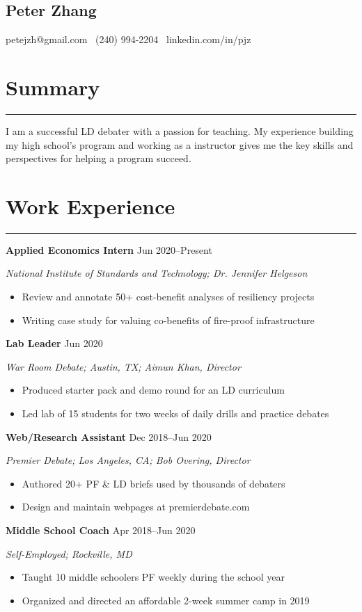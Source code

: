 \documentclass[11pt]{article}
\newcommand{\name}[1]{\begin{center}\section*{\huge \color{highlight} #1}\end{center}}
\newcommand{\topinfo}[1]{\begin{center}\vspace{-0.2cm}#1\vspace{-0.2cm}\end{center}}
\newcommand{\resumesection}[1]{\vspace{-0.4cm}\section*{\color{highlight}#1}\vspace{-0.3cm}\hrule\vspace{0.3cm}}
\begin{document}
\name{Peter Zhang}
\topinfo{petejzh@gmail.com \textbullet\ (240) 994-2204 \textbullet\ linkedin.com/in/pjz}

\resumesection{Summary}

\begin{adjustwidth}{0.4cm}{}
\noindent I am a successful LD debater with a passion for teaching. My experience building my high school's program and working as a instructor gives me the key skills and perspectives for helping a program succeed.
\end{adjustwidth}

\resumesection{Work Experience}

\textbf{Applied Economics Intern} \hfill Jun 2020--Present\par
\textit{National Institute of Standards and Technology; Dr. Jennifer Helgeson}
\begin{itemize}
	\item Review and annotate 50+ cost-benefit analyses of resiliency projects
	\item Writing case study for valuing co-benefits of fire-proof infrastructure
\end{itemize}\vspace{0.1cm}

\textbf{Lab Leader}  \hfill Jun 2020 \par
\textit{War Room Debate; Austin, TX; Aimun Khan, Director}
\begin{itemize}
	\item Produced starter pack and demo round for an LD curriculum
	\item Led lab of 15 students for two weeks of daily drills and practice debates
\end{itemize}

\textbf{Web/Research Assistant}   \hfill Dec 2018--Jun 2020 \par
\textit{Premier Debate; Los Angeles, CA; Bob Overing, Director}
\begin{itemize}
	\item Authored 20+ PF \& LD briefs used by thousands of debaters
	\item Design and maintain webpages at premierdebate.com
\end{itemize}

\textbf{Middle School Coach} \hfill Apr 2018--Jun 2020 \par
\textit{Self-Employed; Rockville, MD}
\begin{itemize}
	\item Taught 10 middle schoolers PF weekly during the school year
	\item Organized and directed an affordable 2-week summer camp in 2019
\end{itemize}
\end{document}
